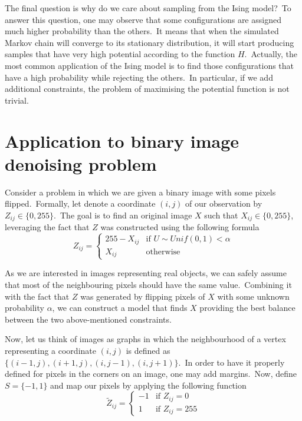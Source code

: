 \documentclass[a4paper, 11pt, onecolumn, openany, titlepage]{report}
\theoremstyle{default_theorem_style}\newtheorem{theorem}{Theorem}
\theoremstyle{default_theorem_style}\newtheorem{definition}{Definition}
\begin{document}
The final question is why do we care about sampling from the Ising model?\ To answer this question, one may observe
that some configurations are assigned much higher probability than the others.\ It means that when the simulated
Markov chain will converge to its stationary distribution, it will start producing samples that have very high
potential according to the function $H$.\ Actually, the most common application of the Ising model is to find
those configurations that have a high probability while rejecting the others.\ In particular, if we add
additional constraints, the problem of maximising the potential function is not trivial.

\section{Application to binary image denoising problem}\label{section:binary_images_problem}

Consider a problem in which we are given a binary image with some pixels flipped.\ Formally, let denote a coordinate
$(i, j)$ of our observation by $Z_{ij} \in \{0, 255\}$.\ The goal is to find an original image $X$ such that
$X_{ij} \in \{0, 255\}$, leveraging the fact that $Z$ was constructed using the following formula
$$
Z_{ij} =
\begin{cases}
  255 - X_{ij} &\text{if $U \sim Unif(0, 1) < \alpha$}\\
  X_{ij} &\text{otherwise}
\end{cases}
$$

As we are interested in images representing real objects, we can safely assume that most of the neighbouring pixels
should have the same value.\ Combining it with the fact that $Z$ was generated by flipping pixels of $X$ with some
unknown probability $\alpha$, we can construct a model that finds $X$ providing the best balance between the
two above-mentioned constraints.\newline

Now, let us think of images as graphs in which the neighbourhood of a vertex representing a
coordinate $(i, j)$ is defined as $\{(i - 1, j), (i + 1, j), (i, j - 1), (i, j + 1)\}$.\ In
order to have it properly defined for pixels in the corners on an image, one may add margins.\ Now, define
$S = \{-1, 1\}$ and map our pixels by applying the following function
$$
\tilde{Z}_{ij} =
\begin{cases}
  -1 &\text{if $Z_{ij} = 0$}\\
  1 &\text{if $Z_{ij} = 255$}
\end{cases}
$$
\end{document}
